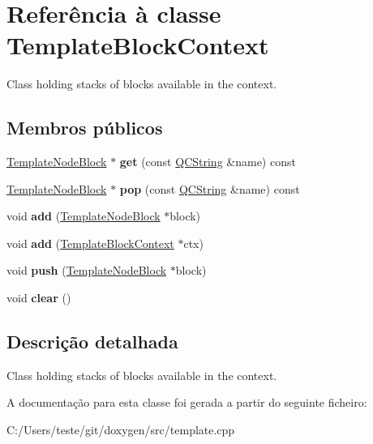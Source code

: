 \hypertarget{class_template_block_context}{\section{Referência à classe Template\-Block\-Context}
\label{class_template_block_context}
}


Class holding stacks of blocks available in the context.  


\subsection*{Membros públicos}
\begin{DoxyCompactItemize}
\item 
\hypertarget{class_template_block_context_ac1f6241a610260e16ab9967e7ce7c2b6}{\hyperlink{class_template_node_block}{Template\-Node\-Block} $\ast$ {\bfseries get} (const \hyperlink{class_q_c_string}{Q\-C\-String} \&name) const }\label{class_template_block_context_ac1f6241a610260e16ab9967e7ce7c2b6}

\item 
\hypertarget{class_template_block_context_a999ae6cab075f0a81e6bb65c9dbdc0ff}{\hyperlink{class_template_node_block}{Template\-Node\-Block} $\ast$ {\bfseries pop} (const \hyperlink{class_q_c_string}{Q\-C\-String} \&name) const }\label{class_template_block_context_a999ae6cab075f0a81e6bb65c9dbdc0ff}

\item 
\hypertarget{class_template_block_context_ac49910f03e4be93002a4373a3cc1e8ea}{void {\bfseries add} (\hyperlink{class_template_node_block}{Template\-Node\-Block} $\ast$block)}\label{class_template_block_context_ac49910f03e4be93002a4373a3cc1e8ea}

\item 
\hypertarget{class_template_block_context_a0a7ea6dd7ad05f6b86833747b1c8949a}{void {\bfseries add} (\hyperlink{class_template_block_context}{Template\-Block\-Context} $\ast$ctx)}\label{class_template_block_context_a0a7ea6dd7ad05f6b86833747b1c8949a}

\item 
\hypertarget{class_template_block_context_a218e4ede19dced024f1d7942ca56b153}{void {\bfseries push} (\hyperlink{class_template_node_block}{Template\-Node\-Block} $\ast$block)}\label{class_template_block_context_a218e4ede19dced024f1d7942ca56b153}

\item 
\hypertarget{class_template_block_context_ac8bb3912a3ce86b15842e79d0b421204}{void {\bfseries clear} ()}\label{class_template_block_context_ac8bb3912a3ce86b15842e79d0b421204}

\end{DoxyCompactItemize}


\subsection{Descrição detalhada}
Class holding stacks of blocks available in the context. 

A documentação para esta classe foi gerada a partir do seguinte ficheiro\-:\begin{DoxyCompactItemize}
\item 
C\-:/\-Users/teste/git/doxygen/src/template.\-cpp\end{DoxyCompactItemize}
